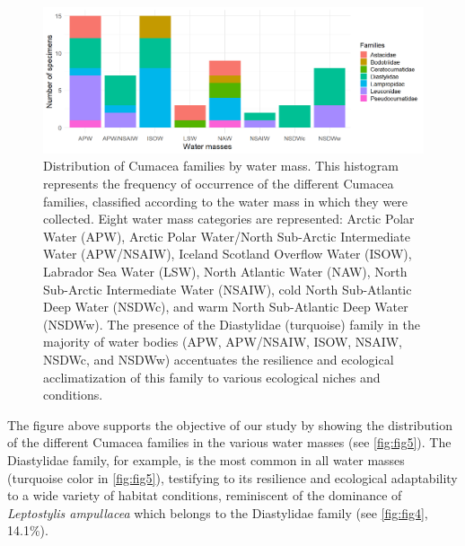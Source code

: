 \begin{figure}[htbp]
    \centering
    \includegraphics[width=\textwidth]{figure3.png}
    \caption{Distribution of Cumacea families by water mass. This histogram represents the frequency of occurrence of the different Cumacea families, classified according to the water mass in which they were collected. Eight water mass categories are represented: Arctic Polar Water (APW), Arctic Polar Water/North Sub-Arctic Intermediate Water (APW/NSAIW), Iceland Scotland Overflow Water (ISOW), Labrador Sea Water (LSW), North Atlantic Water (NAW), North Sub-Arctic Intermediate Water (NSAIW), cold North Sub-Atlantic Deep Water (NSDWc), and warm North Sub-Atlantic Deep Water (NSDWw). The presence of the Diastylidae (turquoise) family in the majority of water bodies (APW, APW/NSAIW, ISOW, NSAIW, NSDWc, and NSDWw) accentuates the resilience and ecological acclimatization of this family to various ecological niches and conditions. \label{fig:fig5}}
\end{figure}

The figure above supports the objective of our study by showing the distribution of the different Cumacea families in the various water masses (see \autoref{fig:fig5}). The Diastylidae family, for example, is the most common in all water masses (turquoise color in \autoref{fig:fig5}), testifying to its resilience and ecological adaptability to a wide variety of habitat conditions, reminiscent of the dominance of \emph{Leptostylis ampullacea} which belongs to the Diastylidae family (see \autoref{fig:fig4}, 14.1\%).

